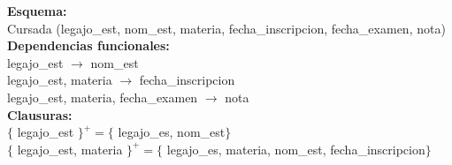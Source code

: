 \documentclass[preview]{standalone}
\begin{document}
\textbf{Esquema:}\\
Cursada (legajo\_est, nom\_est, materia, fecha\_inscripcion, fecha\_examen, nota)\\

\textbf{Dependencias funcionales:}\\
legajo\_est $\rightarrow$ nom\_est\\
legajo\_est, materia $\rightarrow$ fecha\_inscripcion\\
legajo\_est, materia, fecha\_examen $\rightarrow$ nota\\

\textbf{Clausuras:}\\
$\big\{$ legajo\_est $\big\}^+ = \big\{$ legajo\_es, nom\_est$\big\}$\\
$\big\{$ legajo\_est, materia $\big\}^+ = \big\{$ legajo\_es, materia, nom\_est, fecha\_inscripcion$\big\}$\\
\end{document}
